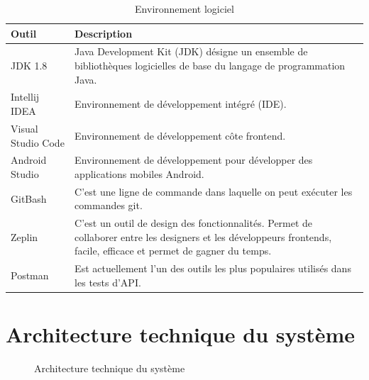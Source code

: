 \begin{table}[H]
\begin{center}
\begin{tabularx}{\textwidth}{ |l|X| }
\hline Outil & Description \\\hline \hline
JDK 1.8 & Java Development Kit (JDK) d\'esigne un ensemble de biblioth\`eques logicielles de base du langage de programmation Java.\\ \hline
Intellij IDEA & Environnement de d\'eveloppement int\'egr\'e (IDE).\\ \hline
Visual Studio Code & Environnement de d\'eveloppement c\^ote frontend.\\ \hline
Android Studio & Environnement de d\'eveloppement pour d\'evelopper des applications mobiles Android.\\ \hline
GitBash & C'est une ligne de commande dans laquelle on peut ex\'ecuter les commandes git.\\ \hline
Zeplin & C'est un outil de design des fonctionnalit\'es. Permet de collaborer entre les designers et les d\'eveloppeurs frontends, facile, efficace et permet de gagner du temps.\\ \hline
Postman & Est actuellement l'un des outils les plus populaires utilis\'es dans les tests d'\gls{API}.\\
\hline
\end{tabularx}
\caption{Environnement logiciel}
\end{center}
\end{table}

\section{Architecture technique du syst\`eme}

\begin{figure}[H]
	\caption{\label{fig:my-label} Architecture technique du syst\`eme}
\end{figure}